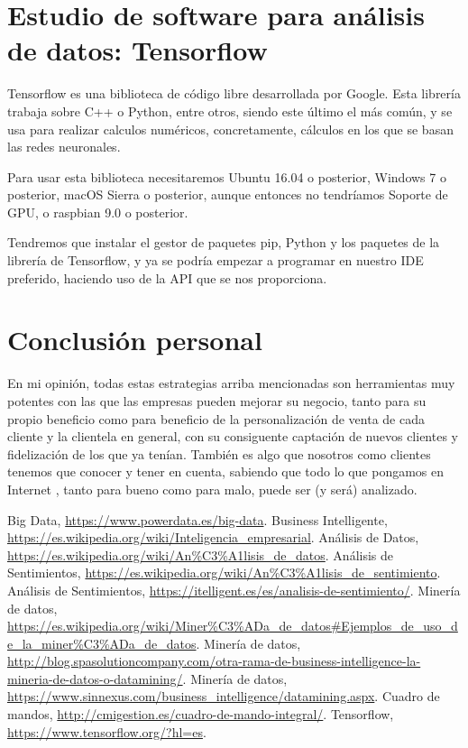 \documentclass{article}
\begin{document}
\section{Estudio de software para análisis de datos: Tensorflow}
Tensorflow es una biblioteca de código libre desarrollada por Google. Esta librería trabaja sobre C++ o Python, entre otros, siendo este último el más común, y se usa para realizar calculos numéricos, concretamente, cálculos en los que se basan las redes neuronales.

Para usar esta biblioteca necesitaremos Ubuntu 16.04 o posterior, Windows 7 o posterior, macOS Sierra o posterior, aunque entonces no tendríamos Soporte de GPU, o raspbian 9.0 o posterior.

Tendremos que instalar el gestor de paquetes pip, Python y los paquetes de la librería de Tensorflow, y ya se podría empezar a programar en nuestro IDE preferido, haciendo uso de la API que se nos proporciona.




\section{Conclusión personal}
En mi opinión, todas estas estrategias arriba mencionadas son herramientas muy potentes con las que las empresas pueden mejorar su negocio, tanto para su propio beneficio como para beneficio de la personalización de venta de cada cliente y la clientela en general, con su consiguente captación de nuevos clientes y fidelización de los que ya tenían. También es algo que nosotros como clientes tenemos que conocer y tener en cuenta, sabiendo que todo lo que pongamos en Internet , tanto para bueno como para malo, puede ser (y será) analizado.

\begin{thebibliography}{9}
Big Data, 
\url{https://www.powerdata.es/big-data}.
Business Intelligente, 
\url{https://es.wikipedia.org/wiki/Inteligencia_empresarial}.
Análisis de Datos, 
\url{https://es.wikipedia.org/wiki/An\%C3\%A1lisis_de_datos}.
Análisis de Sentimientos, 
\url{https://es.wikipedia.org/wiki/An\%C3\%A1lisis_de_sentimiento}.
Análisis de Sentimientos, 
\url{https://itelligent.es/es/analisis-de-sentimiento/}.
Minería de datos, 
\url{https://es.wikipedia.org/wiki/Miner\%C3\%ADa_de_datos#Ejemplos_de_uso_de_la_miner\%C3\%ADa_de_datos}.
Minería de datos, 
\url{http://blog.spasolutioncompany.com/otra-rama-de-business-intelligence-la-mineria-de-datos-o-datamining/}.
Minería de datos, 
\url{https://www.sinnexus.com/business_intelligence/datamining.aspx}.
Cuadro de mandos, 
\url{http://cmigestion.es/cuadro-de-mando-integral/}.
Tensorflow, 
\url{https://www.tensorflow.org/?hl=es}.
\end{thebibliography}
\end{document}
